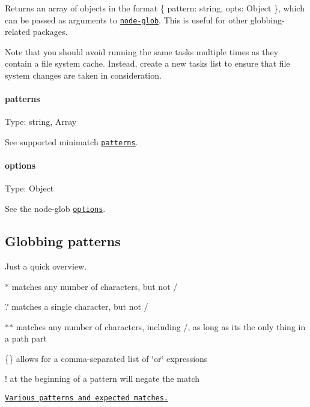 Returns an array of objects in the format {\ttfamily \{ pattern\+: string, opts\+: Object \}}, which can be passed as arguments to \href{https://github.com/isaacs/node-glob}{\tt {\ttfamily node-\/glob}}. This is useful for other globbing-\/related packages.

Note that you should avoid running the same tasks multiple times as they contain a file system cache. Instead, create a new tasks list to ensure that file system changes are taken in consideration.

\paragraph*{patterns}

Type\+: {\ttfamily string}, {\ttfamily Array}

See supported {\ttfamily minimatch} \href{https://github.com/isaacs/minimatch#usage}{\tt patterns}.

\paragraph*{options}

Type\+: {\ttfamily Object}

See the {\ttfamily node-\/glob} \href{https://github.com/isaacs/node-glob#options}{\tt options}.

\subsection*{Globbing patterns}

Just a quick overview.


\begin{DoxyItemize}
\item {\ttfamily $\ast$} matches any number of characters, but not {\ttfamily /}
\item {\ttfamily ?} matches a single character, but not {\ttfamily /}
\item {\ttfamily $\ast$$\ast$} matches any number of characters, including {\ttfamily /}, as long as it\textquotesingle{}s the only thing in a path part
\item {\ttfamily \{\}} allows for a comma-\/separated list of \char`\"{}or\char`\"{} expressions
\item {\ttfamily !} at the beginning of a pattern will negate the match
\end{DoxyItemize}

\href{https://github.com/sindresorhus/multimatch/blob/master/test.js}{\tt Various patterns and expected matches.}

